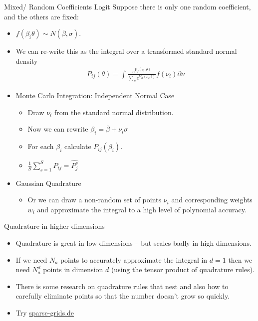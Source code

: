 \documentclass[xcolor=pdftex,dvipsnames,table,mathserif]{beamer}
\begin{document}
\begin{frame}{Mixed/ Random Coefficients Logit}
Suppose there is only one random coefficient, and the others are fixed:
\begin{itemize}
\item $f(\beta_i \theta) \sim N(\overline{\beta},\sigma)$.
\item We can re-write this as the integral over a transformed standard normal density
\begin{eqnarray*}
P_{ij}(\theta) = \int \frac{ e^{V_{ij}(\nu_i,\theta)}}{\sum_k e^{V_{ik}(\nu_i,\theta)}} f(\nu_i) \partial \nu
\end{eqnarray*}
\item Monte Carlo Integration: Independent Normal Case
\begin{itemize}
\item Draw $\nu_i$ from the standard normal distribution.
\item Now we can rewrite $\beta_i = \overline{\beta} + \nu_i \sigma$
\item For each $\beta_i$ calculate $P_{ij}(\beta_i)$.
\item $\frac{1}{S} \sum_{s=1}^S P_{ij} = \widehat{P_{j}^{s}}$
\end{itemize}
\item Gaussian Quadrature
\begin{itemize}
\item Or we can draw a non-random set of points $\nu_i$ and corresponding weights $w_i$ and approximate the integral to a high level of polynomial accuracy.
\end{itemize}
\end{itemize}
\end{frame}

\begin{frame}{Quadrature in higher dimensions}
\begin{itemize}
\item Quadrature is great in low dimensions -- but scales badly in high dimensions.
\item If we need $N_a$ points to accurately approximate the integral in $d=1$ then we need $N_a^d$ points in dimension $d$ (using the tensor product of quadrature rules).
\item There is some research on quadrature rules that nest and also how to carefully eliminate points so that the number doesn't grow so quickly.
\item Try \url{sparse-grids.de}
\end{itemize}
\end{frame}
\end{document}
